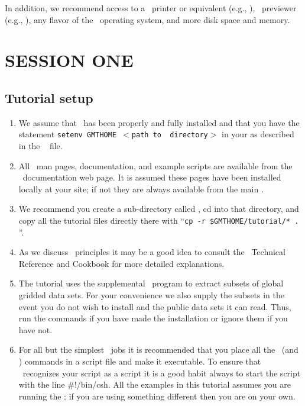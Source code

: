 \documentclass{report}
\begin{document}
In addition, we recommend access to a \PS\ printer or equivalent
(e.g., ), \PS\ previewer (e.g., ),
any flavor of the \UNIX\ operating system, and more disk space and memory.

\chapter{SESSION ONE} 
\thispagestyle{headings}

\section{Tutorial setup}
\begin{enumerate}

\item We assume that \GMT\ has been properly and fully
installed and that you have the statement
\texttt{setenv GMTHOME $<$path to \GMT\ directory$>$}
in your  as
described in the \GMT\  file.

\item All \GMT\ man pages, documentation, and example scripts
are available from the \GMT\ documentation web page.  It is
assumed these pages have been installed locally at your site;
if not they are always available from the main
.

\item We recommend you create a sub-directory called ,
cd into that directory, and copy all the tutorial files directly
there with ``\texttt{cp -r \$GMTHOME/tutorial/* .} ''.

\item As we discuss \GMT\ principles it may be a good idea to
consult the \GMT\ Technical Reference and Cookbook for more
detailed explanations.

\item The tutorial uses the supplemental \GMT\ program
 to extract subsets of global gridded data
sets.  For your convenience we also supply the subsets in the
event you do not wish to install  and the
public data sets it can read.  Thus, run the 
commands if you have made the installation or ignore them if
you have not.

\item For all but the simplest \GMT\ jobs it is recommended that
you place all the \GMT\ (and \UNIX) commands in a  script
file and make it executable.  To ensure that \UNIX\ recognizes
your script as a  script it is a good habit always to start
the script with the line \#!/bin/csh.  All the examples in this
tutorial assumes you are running the ; if you are using
something different then you are on your own.


\end{enumerate}
\end{document}
